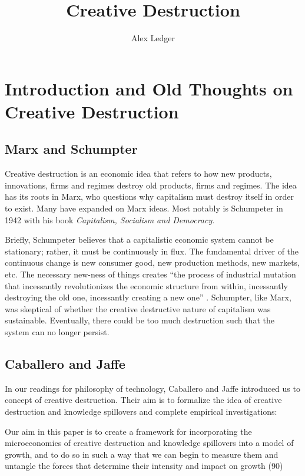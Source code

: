 \documentclass[11pt]{article}
\title{Creative Destruction}
\author{Alex Ledger}
\begin{document}
\maketitle

\section{Introduction and Old Thoughts on Creative Destruction}
\subsection{Marx and Schumpter}
Creative destruction is an economic idea that refers to how new products, innovations, firms and regimes destroy old products, firms and regimes.
The idea has its roots in Marx, who questions why capitalism must destroy itself in order to exist.
Many have expanded on Marx ideas.
Most notably is Schumpeter in 1942 with his book \textit{Capitalism, Socialism and Democracy}.

Briefly, Schumpeter believes that a capitalistic economic system cannot be stationary; rather, it must be continuously in flux. 
The fundamental driver of the continuous change is new consumer good, new production methods, new markets, etc. 
The necessary new-ness of things creates ``the process of industrial mutation that incessantly revolutionizes the economic structure from within, incessantly destroying the old one, incessantly creating a new one'' \cite{wikipedia quote on schumpeter}.
Schumpter, like Marx, was skeptical of whether the creative destructive nature of capitalism was sustainable. 
Eventually, there could be too much destruction such that the system can no longer persist.

\subsection{Caballero and Jaffe}
In our readings for philosophy of technology, Caballero and Jaffe introduced us to concept of creative destruction.
Their aim is to formalize the idea of creative destruction and knowledge spillovers and complete empirical investigations:
\begin{displayquote}
    Our aim in this paper is to create a framework for incorporating the microeconomics of creative destruction and knowledge spillovers into a model of growth, and to do so in such a way that we can begin to measure them and untangle the forces that determine their intensity and impact on growth (90)
\end{displayquote}
\end{document}
